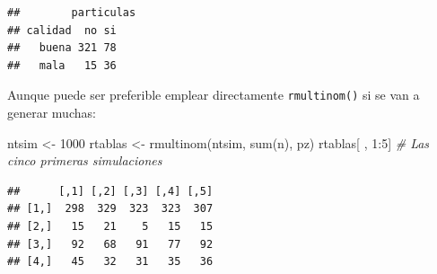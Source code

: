 \documentclass[
]{book}
\newenvironment{Shaded}{\begin{snugshade}}{\end{snugshade}}
\newcommand{\CommentTok}[1]{\textcolor[rgb]{0.56,0.35,0.01}{\textit{#1}}}
\newcommand{\DecValTok}[1]{\textcolor[rgb]{0.00,0.00,0.81}{#1}}
\newcommand{\FunctionTok}[1]{\textcolor[rgb]{0.00,0.00,0.00}{#1}}
\newcommand{\NormalTok}[1]{#1}
\newcommand{\OtherTok}[1]{\textcolor[rgb]{0.56,0.35,0.01}{#1}}
\newcommand{\SpecialCharTok}[1]{\textcolor[rgb]{0.00,0.00,0.00}{#1}}
\theoremstyle{break}
\theoremstyle{nonumberplain}
\begin{document}
\begin{verbatim}
##        particulas
## calidad  no si
##   buena 321 78
##   mala   15 36
\end{verbatim}

Aunque puede ser preferible emplear directamente \texttt{rmultinom()} si se van a generar muchas:

\begin{Shaded}
\begin{Highlighting}[]
\NormalTok{ntsim }\OtherTok{\textless{}{-}} \DecValTok{1000}
\NormalTok{rtablas }\OtherTok{\textless{}{-}} \FunctionTok{rmultinom}\NormalTok{(ntsim, }\FunctionTok{sum}\NormalTok{(n), pz)}
\NormalTok{rtablas[ , }\DecValTok{1}\SpecialCharTok{:}\DecValTok{5}\NormalTok{] }\CommentTok{\# Las cinco primeras simulaciones}
\end{Highlighting}
\end{Shaded}

\begin{verbatim}
##      [,1] [,2] [,3] [,4] [,5]
## [1,]  298  329  323  323  307
## [2,]   15   21    5   15   15
## [3,]   92   68   91   77   92
## [4,]   45   32   31   35   36
\end{verbatim}
\end{document}

